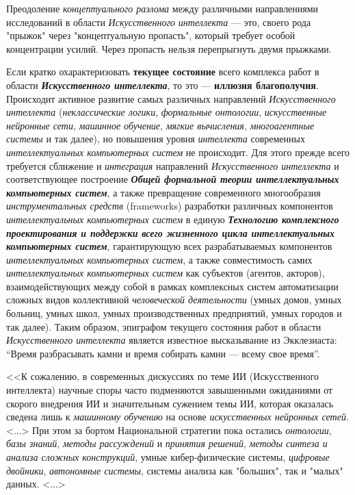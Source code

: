 Преодоление \textit{концептуального разлома} между различными направлениями исследований в области \textit{Искусственного интеллекта} --- это, своего рода "прыжок"{} через "концептуальную пропасть"{}, который требует особой концентрации усилий. Через пропасть нельзя перепрыгнуть двумя прыжками.

Если кратко охарактеризовать \textbf{текущее состояние} всего комплекса работ в области \textbf{\textit{Искусственного интеллекта}}, то это --- \textbf{иллюзия благополучия}. Происходит активное  развитие самых различных направлений \textit{Искусственного интеллекта} (\textit{неклассические логики}, \textit{формальные онтологии}, \textit{искусственные нейронные сети}, \textit{машинное обучение}, \textit{мягкие вычисления}, \textit{многоагентные системы} и так далее), но  повышения уровня \textit{интеллекта} современных \textit{интеллектуальных компьютерных систем} не происходит. Для этого прежде всего требуется сближение и \textit{интеграция}  направлений \textit{Искусственного интеллекта} и соответствующее построение \textbf{\textit{Общей формальной теории интеллектуальных компьютерных систем}}, а также превращение современного многообразия \textit{инструментальных средств} (frameworks) разработки различных компонентов \textit{интеллектуальных компьютерных систем} в единую \textbf{\textit{Технологию комплексного проектирования и поддержки всего жизненного цикла интеллектуальных компьютерных систем}}, гарантирующую  всех разрабатываемых компонентов \textit{интеллектуальных компьютерных систем}, а также совместимость самих \textit{интеллектуальных компьютерных систем} как  субъектов (агентов, акторов), взаимодействующих между собой в рамках комплексных систем автоматизации сложных видов коллективной \textit{человеческой деятельности} (умных домов, умных больниц, умных школ, умных производственных предприятий, умных городов и так далее). Таким образом, эпиграфом текущего состояния работ в области \textit{Искусственного интеллекта} является известное высказывание из Экклезиаста: ``Время разбрасывать камни и время собирать камни --- всему свое время''.

<<К сожалению, в современных дискуссиях по теме ИИ (Искусственного интеллекта) научные споры часто подменяются завышенными ожиданиями от скорого внедрения ИИ и значительным сужением темы ИИ, которая оказалась сведена лишь к \textit{машинному обучению} на основе \textit{искусственных нейронных сетей}. <...> При этом за бортом Национальной стратегии пока остались \textit{онтологии}, \textit{базы знаний}, \textit{методы рассуждений} и \textit{принятия решений}, \textit{методы синтеза и} \textit{анализа сложных конструкций}, умные кибер-физические системы, \textit{цифровые двойники}, \textit{автономные системы}, системы анализа как "больших"{}, так и "малых"{} данных. <...>

